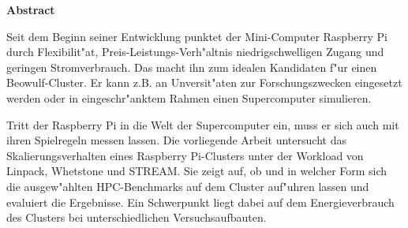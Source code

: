 \vspace*{2cm}

\begin{center}
    \textbf{Abstract}
\end{center}

\vspace*{1cm}

\noindent 
Seit dem Beginn seiner Entwicklung punktet der Mini-Computer Raspberry Pi durch Flexibilit"at, Preis-Leistungs-Verh"altnis niedrigschwelligen Zugang und geringen Stromverbrauch. Das macht ihn zum idealen Kandidaten f"ur einen Beowulf-Cluster. Er kann z.B. an Unversit"aten zur Forschungszwecken eingesetzt werden oder in eingeschr"anktem Rahmen einen Supercomputer simulieren. 

Tritt der Raspberry Pi in die Welt der Supercomputer ein, muss er sich auch mit ihren Spielregeln messen lassen. Die vorliegende Arbeit untersucht das Skalierungsverhalten eines Raspberry Pi-Clusters unter der Workload von Linpack, Whetstone und STREAM. Sie zeigt auf, ob und in welcher Form sich die ausgew"ahlten HPC-Benchmarks auf dem Cluster auf"uhren lassen und evaluiert die Ergebnisse. Ein Schwerpunkt liegt dabei auf dem Energieverbrauch des Clusters bei unterschiedlichen Versuchsaufbauten. 

